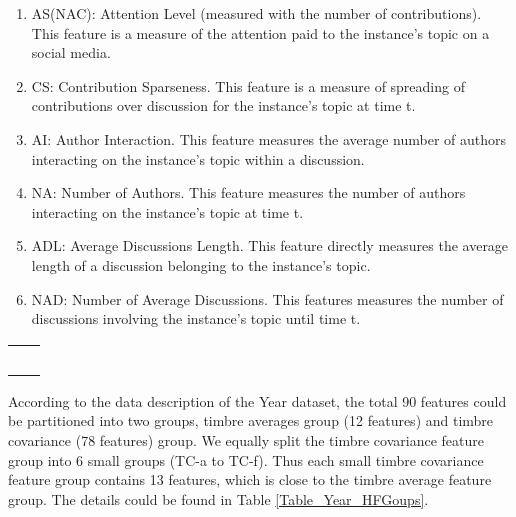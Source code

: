 \documentclass{article}
\begin{document}
\begin{table}[h]
\begin{threeparttable}
\begin{enumerate}
\item AS(NAC): Attention Level (measured with the number of contributions). This feature is a measure of the attention paid to the instance's topic on a social media.                                             
\item CS: Contribution Sparseness. This feature is a measure of spreading of contributions over discussion for the instance's topic at time t.                               
\item AI: Author Interaction. This feature measures the average number of authors interacting on the instance's topic within a discussion.                               
\item NA: Number of Authors. This feature measures the number of authors interacting on the instance's topic at time t.                                                 
\item ADL: Average Discussions Length. This feature directly measures the average length of a discussion belonging to the instance's topic.                                      
\item NAD: Number of Average Discussions. This features measures the number of discussions involving the instance's topic until time t.                                           
\end{enumerate}
\end{threeparttable}
\begin{tabular}{c} \hline
~\hspace{12cm}~
\end{tabular}
\end{table}
According to the data description of the Year dataset, the total 90 features could be partitioned into two groups, timbre averages group (12 features) and timbre covariance (78 features) group.
We equally split the timbre covariance feature group into 6 small groups (TC-a to TC-f).
Thus each small timbre covariance feature group contains 13 features, which is close to the timbre average feature group.
The details could be found in Table \ref{Table_Year_HFGoups}.
\end{document}
